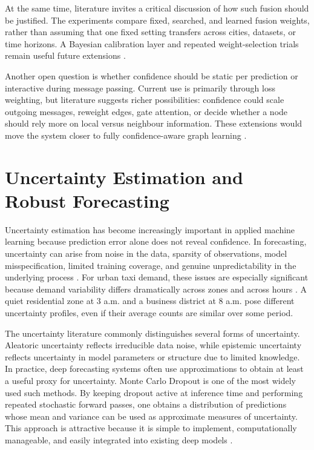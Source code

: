 \documentclass[12pt,a4paper]{report}
\begin{document}
At the same time, literature invites a critical discussion of how such fusion should be justified. The experiments compare fixed, searched, and learned fusion weights, rather than assuming that one fixed setting transfers across cities, datasets, or time horizons. A Bayesian calibration layer and repeated weight-selection trials remain useful future extensions \cite{wang2024gnnuncertaintysurvey,moon2020confidence}.

Another open question is whether confidence should be static per prediction or interactive during message passing. Current use is primarily through loss weighting, but literature suggests richer possibilities: confidence could scale outgoing messages, reweight edges, gate attention, or decide whether a node should rely more on local versus neighbour information. These extensions would move the system closer to fully confidence-aware graph learning \cite{park2022confidenceaware,chernikova2025uncertaintympnn}.

\section{Uncertainty Estimation and Robust Forecasting}

Uncertainty estimation has become increasingly important in applied machine learning because prediction error alone does not reveal confidence. In forecasting, uncertainty can arise from noise in the data, sparsity of observations, model misspecification, limited training coverage, and genuine unpredictability in the underlying process \cite{gal2016dropout,wang2024gnnuncertaintysurvey}. For urban taxi demand, these issues are especially significant because demand variability differs dramatically across zones and across hours \cite{zhuang2022sparse,wang2024probgnn}. A quiet residential zone at 3 a.m. and a business district at 8 a.m. pose different uncertainty profiles, even if their average counts are similar over some period.

The uncertainty literature commonly distinguishes several forms of uncertainty. Aleatoric uncertainty reflects irreducible data noise, while epistemic uncertainty reflects uncertainty in model parameters or structure due to limited knowledge. In practice, deep forecasting systems often use approximations to obtain at least a useful proxy for uncertainty. Monte Carlo Dropout is one of the most widely used such methods. By keeping dropout active at inference time and performing repeated stochastic forward passes, one obtains a distribution of predictions whose mean and variance can be used as approximate measures of uncertainty. This approach is attractive because it is simple to implement, computationally manageable, and easily integrated into existing deep models \cite{gal2016dropout}.
\end{document}
